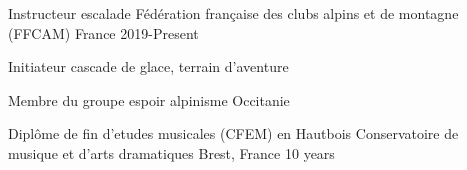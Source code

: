 

\begin{cventries}

  \cventry
    {Instructeur escalade} %
    {Fédération française des clubs alpins et de montagne (FFCAM)} %
    {France} %
    {2019-Present} %
    {
      \begin{cvitems} %
        \item {Initiateur cascade de glace, terrain d'aventure}
        \item {Membre du groupe espoir alpinisme Occitanie}
      \end{cvitems}
    }

  \cventry
  {Diplôme de fin d'etudes musicales (CFEM) en Hautbois} %
    {Conservatoire de musique et d'arts dramatiques} %
    {Brest, France} %
    {10 years} %
    { }
\end{cventries}
